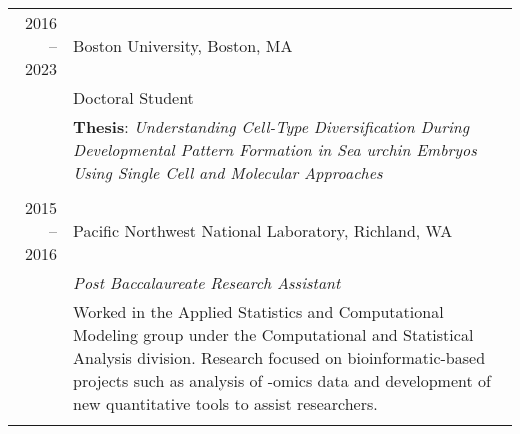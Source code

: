 \documentclass[a4paper,10pt]{report}
\begin{document}
\section{\color{linkcolour}{Professional History}}
\begin{tabular}{r|p{11cm}}
	\textsc{2016 -- 2023} & Boston University, Boston, MA                                                                                                                                                   \\
	                      & Doctoral Student                                                                                                                                                                \\
	                      & \textbf{Thesis}: \emph{\small{Understanding Cell-Type Diversification During Developmental Pattern Formation in Sea urchin Embryos Using Single Cell and Molecular Approaches}} \\
	\multicolumn{2}{c}{}                                                                                                                                                                                    \\
	\textsc{2015 -- 2016} & Pacific Northwest National Laboratory, Richland, WA                                                                                                                             \\
	                      & \emph{Post Baccalaureate Research Assistant}                                                                                                                                    \\
	                      & \footnotesize{Worked in the Applied Statistics and Computational Modeling
		group under the Computational and Statistical Analysis division.
		Research focused on bioinformatic-based projects such as
		analysis of -omics data and development of new quantitative
	tools to assist researchers.}                                                                                                                                                                           \\
	\multicolumn{2}{c}{}                                                                                                                                                                                    \\


\end{tabular}
\end{document}
